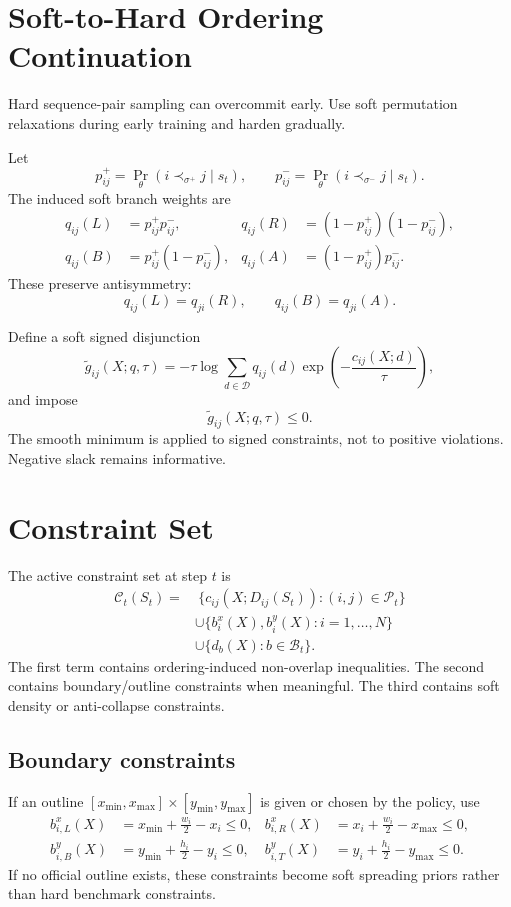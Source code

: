 \documentclass[11pt]{article}
\newcommand{\Branch}{\mathcal{D}}
\newcommand{\Pset}{\mathcal{P}}
\newcommand{\Bset}{\mathcal{B}}
\newcommand{\Constraint}{\mathcal{C}}
\newcommand{\seqp}{\sigma^+}
\newcommand{\seqm}{\sigma^-}
\begin{document}
\section{Soft-to-Hard Ordering Continuation}

Hard sequence-pair sampling can overcommit early. Use soft permutation relaxations during early training and harden gradually.

Let
\[
    p^+_{ij}=\Pr_\theta(i\prec_{\seqp}j\mid s_t),
    \qquad
    p^-_{ij}=\Pr_\theta(i\prec_{\seqm}j\mid s_t).
\]
The induced soft branch weights are
\[
\begin{aligned}
    q_{ij}(L)&=p^+_{ij}p^-_{ij},
    &q_{ij}(R)&=(1-p^+_{ij})(1-p^-_{ij}),\\
    q_{ij}(B)&=p^+_{ij}(1-p^-_{ij}),
    &q_{ij}(A)&=(1-p^+_{ij})p^-_{ij}.
\end{aligned}
\]
These preserve antisymmetry:
\[
    q_{ij}(L)=q_{ji}(R),
    \qquad
    q_{ij}(B)=q_{ji}(A).
\]

Define a soft signed disjunction
\[
    \widetilde g_{ij}(X;q,\tau)
    =-\tau\log\sum_{d\in\Branch}
    q_{ij}(d)\exp\!\left(-\frac{c_{ij}(X;d)}{\tau}\right),
\]
and impose
\[
    \widetilde g_{ij}(X;q,\tau)\le0.
\]
The smooth minimum is applied to signed constraints, not to positive violations. Negative slack remains informative.

\section{Constraint Set}

The active constraint set at step $t$ is
\[
\begin{aligned}
\Constraint_t(S_t)
=&\ \{c_{ij}(X;D_{ij}(S_t)):(i,j)\in\Pset_t\}\\
&\cup\{b_i^x(X),b_i^y(X): i=1,\ldots,N\}\\
&\cup\{d_b(X): b\in\Bset_t\}.
\end{aligned}
\]
The first term contains ordering-induced non-overlap inequalities. The second contains boundary/outline constraints when meaningful. The third contains soft density or anti-collapse constraints.

\subsection{Boundary constraints}

If an outline $[x_{\min},x_{\max}]\times[y_{\min},y_{\max}]$ is given or chosen by the policy, use
\[
\begin{aligned}
    b^x_{i,L}(X)&=x_{\min}+\frac{w_i}{2}-x_i\le0,
    &b^x_{i,R}(X)&=x_i+\frac{w_i}{2}-x_{\max}\le0,\\
    b^y_{i,B}(X)&=y_{\min}+\frac{h_i}{2}-y_i\le0,
    &b^y_{i,T}(X)&=y_i+\frac{h_i}{2}-y_{\max}\le0.
\end{aligned}
\]
If no official outline exists, these constraints become soft spreading priors rather than hard benchmark constraints.
\end{document}
